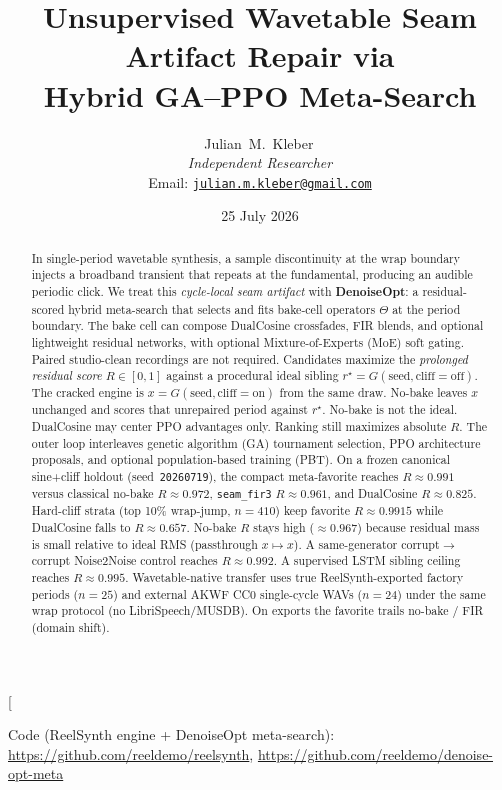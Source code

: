 \documentclass[10pt,twocolumn,letterpaper]{article}
\title{Unsupervised Wavetable Seam Artifact Repair via\\
Hybrid GA--PPO Meta-Search}
\author{%
  Julian~M.~Kleber\,\orcidlink{0000-0001-5518-0932}\\[2pt]
  \textit{Independent Researcher}\\[2pt]
  \normalsize
  Email:
  \href{mailto:julian.m.kleber@gmail.com}{\texttt{julian.m.kleber@gmail.com}}
}
\date{25 July 2026}
\theoremstyle{remark}
\begin{document}
\twocolumn[{%
  \maketitle
  \begin{center}\footnotesize
    Code (ReelSynth engine + DenoiseOpt meta-search):
    \url{https://github.com/reeldemo/reelsynth},
    \url{https://github.com/reeldemo/denoise-opt-meta}
  \end{center}
  \begin{abstract}
    In single-period wavetable synthesis, a sample discontinuity at the wrap boundary injects a
    broadband transient that repeats at the fundamental, producing an audible periodic click.
    We treat this \emph{cycle-local seam artifact} with \textbf{DenoiseOpt}: a residual-scored hybrid
    meta-search that selects and fits bake-cell operators $\Theta$ at the period boundary.
    The bake cell can compose DualCosine crossfades, FIR blends, and optional lightweight residual
    networks, with optional Mixture-of-Experts (MoE) soft gating.
    Paired studio-clean recordings are not required.
    Candidates maximize the \emph{prolonged residual score} $R\in[0,1]$ against a procedural ideal
    sibling $r^{\star}=G(\mathrm{seed},\mathrm{cliff{=}off})$.
    The cracked engine is $x=G(\mathrm{seed},\mathrm{cliff{=}on})$ from the same draw.
    No-bake leaves $x$ unchanged and scores that unrepaired period against $r^{\star}$.
    No-bake is not the ideal.
    DualCosine may center PPO advantages only.
    Ranking still maximizes absolute $R$.
    The outer loop interleaves genetic algorithm (GA) tournament selection,
    PPO architecture proposals, and optional population-based training (PBT).
    On a frozen canonical sine{+}cliff holdout (seed~\texttt{20260719}), the compact meta-favorite
    reaches $R\approx 0.991$ versus classical no-bake $R\approx 0.972$, \texttt{seam\_fir3} $R\approx 0.961$,
    and DualCosine $R\approx 0.825$.
    Hard-cliff strata (top 10\% wrap-jump, $n{=}410$) keep favorite $R\approx 0.9915$ while DualCosine
    falls to $R\approx 0.657$.
    No-bake $R$ stays high ($\approx 0.967$) because residual mass is small relative to ideal RMS
    (passthrough $x\mapsto x$).
    A same-generator corrupt$\to$corrupt Noise2Noise control reaches $R\approx 0.992$.
    A supervised LSTM sibling ceiling reaches $R\approx 0.995$.
    Wavetable-native transfer uses true ReelSynth-exported factory periods ($n{=}25$) and external
    AKWF CC0 single-cycle WAVs ($n{=}24$) under the same wrap protocol (no LibriSpeech/MUSDB).
    On exports the favorite trails no-bake / FIR (domain shift).

\end{abstract}}
\end{document}
